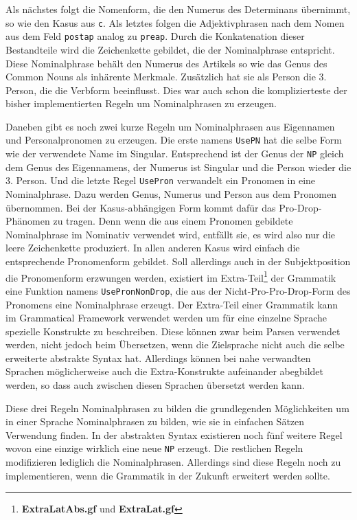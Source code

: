 Als nächstes folgt die Nomenform, die den Numerus des Determinans übernimmt, so wie den Kasus aus \texttt{c}. Als letztes folgen die Adjektivphrasen nach dem Nomen aus dem Feld \texttt{postap} analog zu \texttt{preap}. Durch die Konkatenation dieser Bestandteile wird die Zeichenkette gebildet, die der Nominalphrase entspricht. Diese Nominalphrase behält den Numerus des Artikels so wie das Genus des Common Nouns als inhärente Merkmale. Zusätzlich hat sie als Person die 3. Person, die die Verbform beeinflusst. Dies war auch schon die komplizierteste der bisher implementierten Regeln um Nominalphrasen zu erzeugen. \par
Daneben gibt es noch zwei kurze Regeln um Nominalphrasen aus Eigennamen und Personalpronomen zu erzeugen. Die erste namens \texttt{UsePN} hat die selbe Form wie der verwendete Name im Singular. Entsprechend ist der Genus der \texttt{NP} gleich dem Genus des Eigennamens, der Numerus ist Singular und die Person wieder die 3. Person. Und die letzte Regel \texttt{UsePron} verwandelt ein Pronomen in eine Nominalphrase. Dazu werden Genus, Numerus und Person aus dem Pronomen übernommen. Bei der Kasus-abhängigen Form kommt dafür das Pro-Drop-Phänomen zu tragen. Denn wenn die aus einem Pronomen gebildete Nominalphrase im Nominativ verwendet wird, entfällt sie, es wird also nur die leere Zeichenkette produziert. In allen anderen Kasus wird einfach die entsprechende Pronomenform gebildet. 
Soll allerdings auch in der Subjektposition die Pronomenform erzwungen werden, existiert im Extra-Teil\footnote{\textbf{ExtraLatAbs.gf} und \textbf{ExtraLat.gf}} der Grammatik eine Funktion namens \texttt{UsePronNonDrop}, die aus der Nicht-Pro-Pro-Drop-Form des Pronomens eine Nominalphrase erzeugt. Der Extra-Teil einer Grammatik kann im Grammatical Framework verwendet werden um für eine einzelne Sprache spezielle Konstrukte zu beschreiben. Diese können zwar beim Parsen verwendet werden, nicht jedoch beim Übersetzen, wenn die Zielsprache nicht auch die selbe erweiterte abstrakte Syntax hat. Allerdings können bei nahe verwandten Sprachen möglicherweise auch die Extra-Konstrukte aufeinander abegbildet werden, so dass auch zwischen diesen Sprachen übersetzt werden kann.\par
Diese drei Regeln Nominalphrasen zu bilden die grundlegenden Möglichkeiten um in einer Sprache Nominalphrasen zu bilden, wie sie in einfachen Sätzen Verwendung finden. In der abstrakten Syntax existieren noch fünf weitere Regel wovon eine einzige wirklich eine neue \texttt{NP} erzeugt. Die restlichen Regeln modifizieren lediglich die Nominalphrasen. Allerdings sind diese Regeln noch zu implementieren, wenn die Grammatik in der Zukunft erweitert werden sollte.
